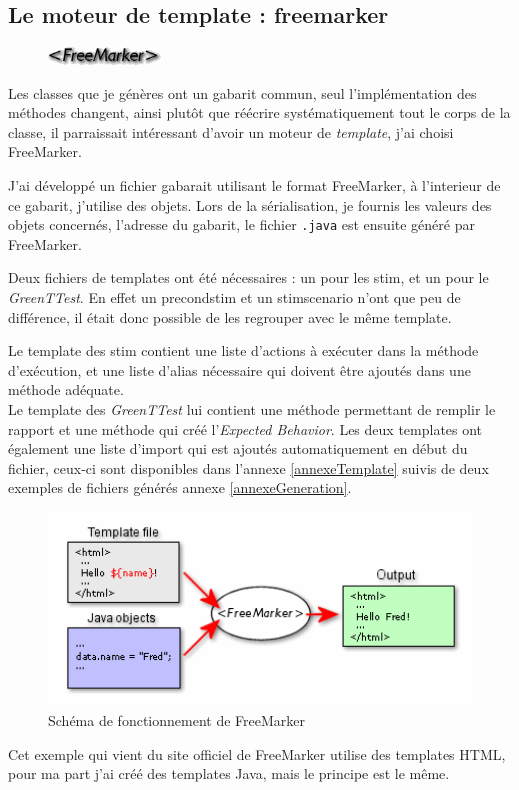 		\subsection{Le moteur de template : freemarker}
		\begin{figure}
			\includegraphics[width=3cm]{contents/images/FreeMarker.png}
		\end{figure}
		Les classes que je génères ont un gabarit commun, seul l'implémentation des méthodes changent, ainsi plutôt que réécrire systématiquement tout le corps de la classe, il parraissait intéressant d'avoir un moteur de \textit{template}, j'ai choisi FreeMarker.

		J'ai développé un fichier gabarait utilisant le format FreeMarker, à l'interieur de ce gabarit, j'utilise des objets. Lors de la sérialisation, je fournis les valeurs des objets concernés, l'adresse du gabarit, le fichier \texttt{.java} est ensuite généré par FreeMarker.

		Deux fichiers de templates ont été nécessaires : un pour les stim, et un pour le \textit{GreenTTest}. En effet un precondstim et un stimscenario n'ont que peu de différence, il était donc possible de les regrouper avec le même template.

		Le template des stim contient une liste d'actions à exécuter dans la méthode d'exécution, et une liste d'alias nécessaire qui doivent être ajoutés dans une méthode adéquate. \\
		Le template des \textit{GreenTTest} lui contient une méthode permettant de remplir le rapport et une méthode qui créé l'\textit{Expected Behavior}.
		Les deux templates ont également une liste d'import qui est ajoutés automatiquement en début du fichier, ceux-ci sont disponibles dans l'annexe \ref{annexeTemplate} suivis de deux exemples de fichiers générés annexe \ref{annexeGeneration}.

	
		\begin{figure}[H]
		\centering
		\includegraphics[width=12cm]{contents/images/FreeMarkerSchema.png}
		\caption{Schéma de fonctionnement de FreeMarker}
		\end{figure}
		\begin{remarque}
		Cet exemple qui vient du site officiel de FreeMarker utilise des templates HTML, pour ma part j'ai créé des templates Java, mais le principe est le même.
		\end{remarque}
